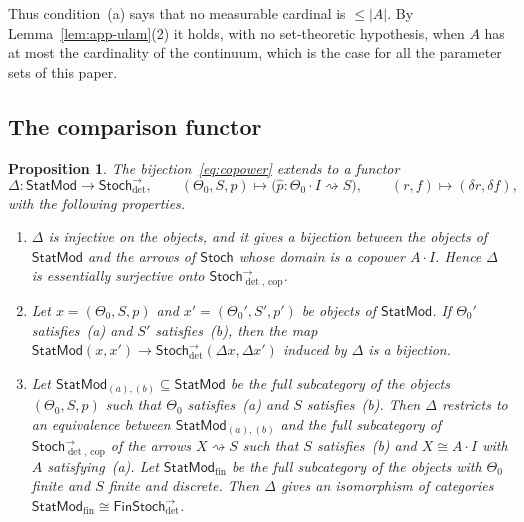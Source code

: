 \documentclass[11pt,a4paper]{article}
\theoremstyle{plain}
\newtheorem{proposition}[theorem]{Proposition}
\theoremstyle{definition}
\theoremstyle{remark}
\newcommand{\cat}[1]{\mathsf{#1}}
\newcommand{\Stoch}{\cat{Stoch}}
\newcommand{\FinStoch}{\cat{FinStoch}}
\newcommand{\del}{\delta}
\newcommand{\StatMod}{\cat{StatMod}}
\newcommand{\Jc}{\Delta}
\newcommand{\Arrdet}[1]{#1^{\rightarrow}_{\det}}
\newcommand{\Arrcop}[1]{#1^{\rightarrow}_{\det,\,\mathrm{cop}}}
\begin{document}
Thus condition~(a) says that no measurable cardinal is $\le |A|$. By
Lemma~\ref{lem:app-ulam}(2) it holds, with no set-theoretic hypothesis, when
$A$ has at most the cardinality of the continuum, which is the case for all the
parameter sets of this paper.

\subsection{The comparison functor}

\begin{proposition}\label{wprop:copower}
The bijection~\eqref{eq:copower} extends to a functor
\[
\Jc \colon \StatMod \longrightarrow \Arrdet{\Stoch},
\qquad
(\Theta_0, S, p) \longmapsto
\bigl(\widehat{p} \colon \Theta_0 \cdot I \rightsquigarrow S\bigr),
\qquad
(r,f) \longmapsto (\del r,\del f),
\]
with the following properties.
\begin{enumerate}
\item $\Jc$ is injective on the objects, and it gives a bijection between the
objects of $\StatMod$ and the arrows of $\Stoch$ whose domain is a copower
$A \cdot I$. Hence $\Jc$ is essentially surjective onto $\Arrcop{\Stoch}$.
\item Let $x = (\Theta_0,S,p)$ and $x' = (\Theta_0',S',p')$ be objects of
$\StatMod$. If $\Theta_0'$ satisfies~(a) and $S'$ satisfies~(b), then the map
$\StatMod(x,x') \to \Arrdet{\Stoch}(\Jc x,\Jc x')$ induced by $\Jc$ is a
bijection.
\item Let $\StatMod_{(a),(b)} \subseteq \StatMod$ be the full subcategory of
the objects $(\Theta_0,S,p)$ such that $\Theta_0$ satisfies~(a) and $S$
satisfies~(b). Then $\Jc$ restricts to an equivalence between
$\StatMod_{(a),(b)}$ and the full subcategory of $\Arrcop{\Stoch}$ of the
arrows $X \rightsquigarrow S$ such that $S$ satisfies~(b) and
$X \cong A\cdot I$ with $A$ satisfying~(a). Let $\StatMod_{\mathrm{fin}}$ be the
full subcategory of the objects with $\Theta_0$ finite and $S$ finite and
discrete. Then $\Jc$ gives an isomorphism of categories
$\StatMod_{\mathrm{fin}} \cong \Arrdet{\FinStoch}$.
\end{enumerate}
\end{proposition}
\end{document}
